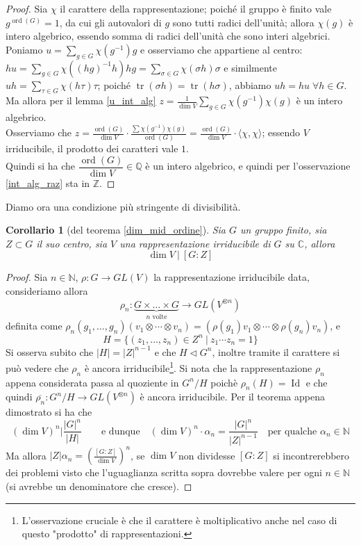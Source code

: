 \documentclass[11pt]{article}
\theoremstyle{plain}
\newtheorem*{cor}{Corollario}
\theoremstyle{definition}
\theoremstyle{remark}
\newcommand{\C}{\mathbb{C}}
\newcommand{\Q}{\mathbb{Q}}
\newcommand{\Z}{\mathbb{Z}}
\newcommand{\N}{\mathbb{N}}
\DeclareMathOperator{\tr}{tr}
\DeclareMathOperator{\Id}{Id}
\DeclareMathOperator{\ord}{ord}
\begin{document}
  \begin{proof}
   Sia $\chi$ il carattere della rappresentazione; poiché il gruppo è finito vale $g^{\ord(G)}=1$, da cui gli autovalori di $g$ sono tutti radici dell'unità; allora $\chi(g)$ è intero algebrico, essendo somma di radici dell'unità che sono interi algebrici.\\
   Poniamo $\displaystyle u=\sum_{g\in G}\chi(g^{-1})g$ e osserviamo che appartiene al centro: $\displaystyle hu=\sum_{g\in G} \chi((hg)^{-1}h)hg=\sum_{\sigma\in G} \chi(\sigma h)\sigma$ e similmente $\displaystyle uh=\sum_{\tau\in G}\chi(h\tau)\tau$; poiché $\tr(\sigma h)=\tr(h\sigma)$, abbiamo $uh=hu\;\forall h\in G$.\\
   Ma allora per il lemma \ref{u_int_alg} $z=\displaystyle\frac1{\dim V}\sum_{g\in G}\chi(g^{-1})\chi(g)$ è un intero algebrico.\\
   Osserviamo che $\displaystyle z=\frac{\ord(G)}{\dim V}\cdot \frac{\sum \chi(g^{-1})\chi(g)}{\ord(G)}=\frac{\ord(G)}{\dim V}\cdot\langle \chi,\chi\rangle$; essendo $V$ irriducibile, il prodotto dei caratteri vale $1$.\\
   Quindi si ha che $\dfrac{\ord(G)}{\dim V}\in\Q$ è un intero algebrico, e quindi per l'osservazione \ref{int_alg_raz} sta in $\Z$.
  \end{proof}

Diamo ora una condizione più stringente di divisibilità.
\begin{cor}[del teorema \ref{dim_mid_ordine}]
	Sia $G$ un gruppo finito, sia $Z\subset G$ il suo centro, sia $V$ una rappresentazione irriducibile di $G$ su $\C$, allora
	\[
		\dim V\ |\ [G:Z]
	\]
\end{cor}
\begin{proof}
	Sia $n\in \N$, $\rho:G\to GL(V)$ la rappresentazione irriducibile data, consideriamo allora
	\[
		\rho_n:\underbrace{G\times\dots\times G}_{n\text{ volte}} \to GL(V^{\otimes n})
	\]
	definita come $\rho_n(g_1,\ldots,g_n)(v_1\otimes\cdots\otimes v_n) = (\rho(g_1)v_1\otimes\cdots\otimes \rho(g_n)v_n)$, e
	\[
		H = \{ (z_1,\ldots,z_n)\in Z^n\ |\ z_1\cdots z_n = 1 \}
	\]
	Si osserva subito che $|H|=|Z|^{n-1}$ e che $H \triangleleft G^n$, inoltre tramite il carattere si può vedere che $\rho_n$ è ancora irriducibile\footnote{L'osservazione cruciale è che il carattere è moltiplicativo anche nel caso di questo "prodotto" di rappresentazioni.}. Si nota che la rappresentazione $\rho_n$ appena considerata passa al quoziente in $G^n/H$ poichè $\rho_n(H) = \Id$ e che quindi $\overline{\rho_n}:G^n/H\to GL(V^{\otimes n})$ è ancora irriducibile. Per il teorema appena dimostrato si ha che
	\[
		(\dim V)^n \Big| \frac{|G|^n}{|H|}\qquad \text{e dunque}\quad (\dim V)^n\cdot \alpha_n = \frac{|G|^n}{|Z|^{n-1}}\quad \text{per qualche }\alpha_n\in \N
	\]
	Ma allora $\displaystyle |Z|\alpha_n = \left(\frac{[G:Z]}{\dim V}\right)^n$, se $\dim V$ non dividesse $[G:Z]$ si incontrerebbero dei problemi visto che l'uguaglianza scritta sopra dovrebbe valere per ogni $n\in \N$ (si avrebbe un denominatore che cresce).


\end{proof}
\end{document}
